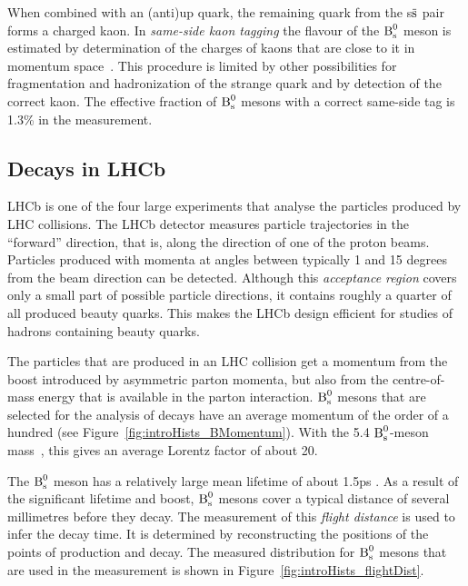 When combined with an (anti)up quark, the remaining quark from the s$\qbar[s]$ pair forms a charged kaon. In \emph{same-side kaon tagging}
the flavour of the $\text{B}_\text{s}^\text{0}$ meson is estimated by determination of the charges of kaons that are close to it in momentum
space~\cite{LHCb-CONF-2012-033}. This procedure is limited by other possibilities for fragmentation and hadronization of the strange quark
and by detection of the correct kaon. The effective fraction of $\text{B}_\text{s}^\text{0}$ mesons with a correct same-side tag is 1.3\% in the \BstoJpsiKK{}
measurement.


\subsection{\texorpdfstring{\BstoJpsiKK}{Bs0->J/psi K+K-} Decays in LHCb}
\label{subsec:intro_LHCb_Jpsiphi}

LHCb is one of the four large experiments that analyse the particles produced by LHC collisions. The LHCb detector measures particle
trajectories in the ``forward'' direction, that is, along the direction of one of the proton beams. Particles produced with momenta at
angles between typically 1 and 15 degrees from the beam direction can be detected. Although this \emph{acceptance region} covers only a
small part of possible particle directions, it contains roughly a quarter of all produced beauty quarks. This makes the LHCb design
efficient for studies of hadrons containing beauty quarks.

The particles that are produced in an LHC collision get a momentum from the boost introduced by asymmetric parton momenta, but also from
the centre-of-mass energy that is available in the parton interaction. $\text{B}_\text{s}^\text{0}$ mesons that are selected for the analysis of \BstoJpsiKK{}
decays have an average momentum of the order of a hundred \GeVc{} (see Figure~\ref{fig:introHists_BMomentum}). With the 5.4\unitsp\GeV{}
$\text{B}_\text{s}^\text{0}$-meson mass~\cite{PDG}, this gives an average Lorentz factor of about 20.

The $\text{B}_\text{s}^\text{0}$ meson has a relatively large mean lifetime of about 1.5\unitsp{}ps \cite{Amhis:2012bh}. As a result of the significant lifetime
and boost, $\text{B}_\text{s}^\text{0}$ mesons cover a typical distance of several millimetres before they decay. The measurement of this \emph{flight distance}
is used to infer the decay time. It is determined by reconstructing the positions of the points of production and decay. The measured
distribution for $\text{B}_\text{s}^\text{0}$ mesons that are used in the \BstoJpsiKK{} measurement is shown in Figure~\ref{fig:introHists_flightDist}.

